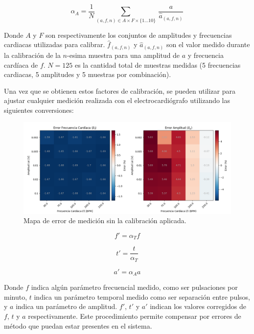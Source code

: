 \documentclass[conference]{IEEEtran}
\begin{document}
\begin{equation}
\alpha_{A} = \dfrac{1}{N} \sum_{(a,f,n) \in A \times F \times \{1...10 \}}
\nolimits ~ \frac{a}{\hat{a}_{(a,f,n)}}
\label{eqn:alpha_a}
\end{equation}



Donde $A$ y $F$ son respectivamente los conjuntos de amplitudes y frecuencias
cardiacas utilizadas para calibrar. $\hat{f}_{(a,f,n)}$ y $\hat{a}_{(a,f,n)}$
son el valor medido durante la calibración de la $n$-esima muestra para una
amplitud de $a$ y frecuencia cardíaca de $f$. $N=125$ es la cantidad total de
muestras medidas (5 frecuencias cardiacas, 5 amplitudes y 5 muestras por
combinación).

Una vez que se obtienen estos factores de calibración, se pueden utilizar para
ajustar cualquier medición realizada con el electrocardiógrafo utilizando las
siguientes conversiones:

\begin{figure}[t]
    \centering
    \includegraphics[width=\textwidth]{figs/calib_error_map.png}
    \caption{Mapa de error de medición sin la calibración aplicada.}
    \label{fig:plot_errpr_sin_calib}
\end{figure}



\begin{equation}
    f' = \alpha_{T} f
    \label{eqn:f_correct}
\end{equation} 

\begin{equation}
    t' = \frac{t}{\alpha_{T}}
    \label{eqn:t_correct}
\end{equation} 

\begin{equation}
    a' = \alpha_{A} a
    \label{eqn:a_correct}
\end{equation} 
        
Donde $f$ indica algún parámetro frecuencial medido, como ser pulsaciones por
minuto, $t$ indica un parámetro temporal medido como ser separación entre
pulsos, y $a$ indica un parámetro de amplitud. $f'$, $t'$ y $a'$ indican los
valores corregidos de $f$, $t$ y $a$ respectivamente.
Este procedimiento permite compensar por errores de método que puedan estar
presentes en el sistema.
\end{document}

